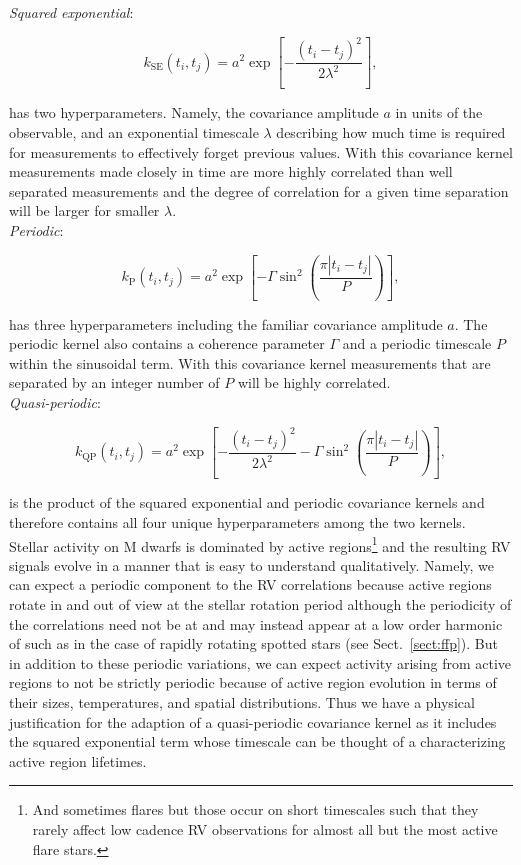 \emph{Squared exponential}: 

\begin{equation}
  k_{\text{SE}}(t_i,t_j) = a^2 \exp{\left[ -\frac{(t_i-t_j)^2}{2\lambda^2} \right]},
\end{equation}

\noindent has two hyperparameters. Namely, the covariance amplitude $a$ in units of the observable,
and an exponential timescale $\lambda$ describing how much time is required for measurements to
effectively forget previous values. With this covariance kernel measurements made closely in time
are more highly correlated than well separated measurements and the degree of correlation for a
given time separation will be larger for smaller $\lambda$. \\

\emph{Periodic}:

\begin{equation}
  k_{\text{P}}(t_i,t_j) = a^2 \exp{\left[ -\Gamma \sin^2{\left( \frac{\pi |t_i-t_j|}{P} \right)} \right]},
\end{equation}

\noindent has three hyperparameters including the familiar covariance amplitude $a$. The periodic kernel
also contains a coherence parameter $\Gamma$ and a periodic timescale $P$ within the sinusoidal term.
With this covariance kernel measurements that are separated by an integer number of $P$ will be highly
correlated. \\

\emph{Quasi-periodic}:

\begin{equation}
  k_{\text{QP}}(t_i,t_j) = a^2 \exp{\left[ -\frac{(t_i-t_j)^2}{2\lambda^2} -\Gamma
      \sin^2{\left( \frac{\pi |t_i-t_j|}{P} \right)} \right]},
\end{equation}

\noindent is the product of the squared exponential and periodic covariance kernels and therefore
contains all four unique hyperparameters among the two kernels. \\

Stellar activity on M dwarfs
is dominated by active regions\citep{lindegren03}\footnote{And sometimes flares but those
  occur on short timescales such that they rarely affect low cadence RV observations for almost
  all but the most active flare stars.} and the resulting RV signals evolve in a manner that
is easy to understand qualitatively. Namely, we can expect a periodic component to the
RV correlations because active regions rotate in and out of view at the stellar rotation period
although the periodicity of the correlations need not be at \prot{} and may instead appear
at a low order harmonic of \prot{} such as in the case of rapidly rotating spotted stars 
(see Sect.~\ref{sect:ffp}). But in addition to these periodic variations, we can expect activity
arising from active regions to not be strictly periodic because of active region evolution
in terms of their sizes, temperatures, and spatial distributions. Thus we
have a physical justification for the adaption of a
quasi-periodic covariance kernel as it includes the squared exponential term
whose timescale can be thought of a characterizing active region lifetimes. \\


